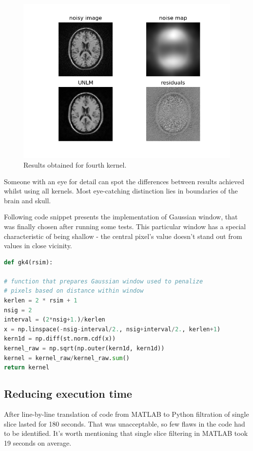 \begin{figure}[H]
	\centering{}
	\includegraphics[scale=1]{figures/module05/gk4results}
	\caption{Results obtained for fourth kernel.} 
\end{figure}

Someone with an eye for detail can spot the differences between results achieved whilst using all kernels. Most eye-catching distinction lies in boundaries of the brain and skull.   


Following code snippet presents the implementation of Gaussian window, that was finally chosen after running some tests. This particular window has a special characteristic of being shallow - the central pixel's value doesn't stand out from values in close vicinity. 

\begin{lstlisting}[language=Python, caption = Code used for Gaussian kernel generation.]
def gk4(rsim):

# function that prepares Gaussian window used to penalize
# pixels based on distance within window
kerlen = 2 * rsim + 1
nsig = 2
interval = (2*nsig+1.)/kerlen
x = np.linspace(-nsig-interval/2., nsig+interval/2., kerlen+1)
kern1d = np.diff(st.norm.cdf(x))
kernel_raw = np.sqrt(np.outer(kern1d, kern1d))
kernel = kernel_raw/kernel_raw.sum()
return kernel
\end{lstlisting}

\subsection*{Reducing execution time}
After line-by-line translation of code from MATLAB to Python filtration of single slice lasted for 180 seconds. That was unacceptable, so few flaws in the code had to be identified. It's worth mentioning that single slice filtering in MATLAB took 19 seconds on average.

